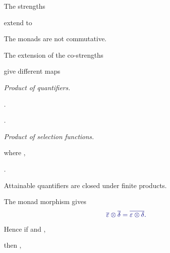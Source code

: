 \documentclass%
[%
Screen4to3,
]{foils}
\begin{document}

The strengths


extend to


\vfill



 The monads are not commutative.

The extension of the co-strengths 

give different maps 


 

 \qquad \qquad \emph{Product of quantifiers.}


\qquad \qquad \qquad {}.

\qquad \qquad \qquad {}.

\vfill

 

\qquad\qquad \emph{Product of selection functions.}

\qquad \qquad\qquad {}

\qquad \qquad \qquad where ,

\qquad \qquad \qquad \phantom{where} . 


Attainable quantifiers are closed under finite products.

\vfill


\quad The monad morphism gives
\[
\darkblue{\overline{\varepsilon} \otimes \overline{\delta} = 
\overline{\varepsilon \otimes \delta}.}
\]

\quad Hence if \darkblue{$\phi = \overline{\varepsilon}$} 
and \darkblue{$\gamma = \overline{\delta}$},

\quad then \darkblue{$\phi \otimes \gamma = \overline{\varepsilon \otimes \delta}$},
\end{document}
